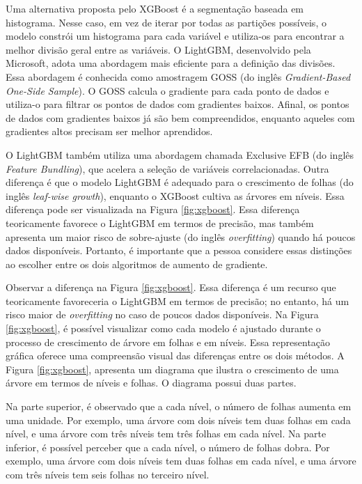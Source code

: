 Uma alternativa proposta pelo XGBoost é a segmentação baseada em histograma. Nesse caso, em vez de iterar por todas as partições possíveis, o modelo constrói um histograma para cada variável e utiliza-os para encontrar a melhor divisão geral entre as variáveis.
O LightGBM, desenvolvido pela Microsoft, adota uma abordagem mais eficiente para a definição das divisões. Essa abordagem é conhecida como amostragem GOSS (do inglês \textit{Gradient-Based One-Side Sample}). O GOSS calcula o gradiente para cada ponto de dados e utiliza-o para filtrar os pontos de dados com gradientes baixos. Afinal, os pontos de dados com gradientes baixos já são bem compreendidos, enquanto aqueles com gradientes altos precisam ser melhor aprendidos.

O LightGBM também utiliza uma abordagem chamada Exclusive EFB (do inglês \textit{Feature Bundling}), que acelera a seleção de variáveis correlacionadas. Outra diferença é que o modelo LightGBM é adequado para o crescimento de folhas (do inglês \textit{leaf-wise growth}), enquanto o XGBoost cultiva as árvores em níveis. Essa diferença pode ser visualizada na Figura \ref{fig:xgboost}.
Essa diferença teoricamente favorece o LightGBM em termos de precisão, mas também apresenta um maior risco de sobre-ajuste (do inglês \textit{overfitting}) quando há poucos dados disponíveis. Portanto, é importante que a pessoa considere essas distinções ao escolher entre os dois algoritmos de aumento de gradiente.

Observar a diferença na Figura \ref{fig:xgboost}. Essa diferença é um recurso que teoricamente favoreceria o LightGBM em termos de precisão; no entanto, há um risco maior de \textit{overfitting} no caso de poucos dados disponíveis.
Na Figura \ref{fig:xgboost}, é possível visualizar como cada modelo é ajustado durante o processo de crescimento de árvore em folhas e em níveis. Essa representação gráfica oferece uma compreensão visual das diferenças entre os dois métodos. A Figura \ref{fig:xgboost}, apresenta um diagrama que ilustra o crescimento de uma árvore em termos de níveis e folhas. O diagrama possui duas partes.

Na parte superior, é observado que a cada nível, o número de folhas aumenta em uma unidade. Por exemplo, uma árvore com dois níveis tem duas folhas em cada nível, e uma árvore com três níveis tem três folhas em cada nível.
Na parte inferior, é possível perceber que a cada nível, o número de folhas dobra. Por exemplo, uma árvore com dois níveis tem duas folhas em cada nível, e uma árvore com três níveis tem seis folhas no terceiro nível.

